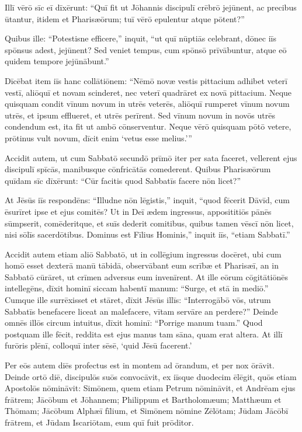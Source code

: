\Versus Illī vērō sīc eī dīxērunt: ``Quī fit ut Jōhannis discipulī crēbrō jejūnent, ac precibus ūtantur, itidem et Pharisæōrum; tuī vērō epulentur atque pōtent?''

\Versus Quibus ille: ``Potestisne efficere,'' inquit, ``ut quī nūptiās celebrant, dōnec iīs spōnsus adest, jejūnent?
\Versus Sed veniet tempus, cum spōnsō prīvābuntur, atque eō quidem tempore jejūnābunt.''

\Versus Dīcēbat item iīs hanc collātiōnem: ``Nēmō novæ vestis pittacium adhibet veterī vestī, aliōquī et novam scinderet, nec veterī quadrāret ex novā pittacium.
\Versus Neque quisquam condit vīnum novum in utrēs veterēs, aliōquī rumperet vīnum novum utrēs, et ipsum efflueret, et utrēs perīrent.
\Versus Sed vīnum novum in novōs utrēs condendum est, ita fit ut ambō cōnserventur.
\Versus Neque vērō quisquam pōtō vetere, prōtinus vult novum, dīcit enim `vetus esse melius.'{}''


\Caput
\Versus Accidit autem, ut cum Sabbatō secundō prīmō iter per sata faceret, vellerent ejus discipulī spīcās, manibusque cōnfricātās comederent.
\Versus Quibus Pharisæōrum quīdam sīc dīxērunt: ``Cūr facitis quod Sabbatīs facere nōn licet?''

\Versus At Jēsūs iīs respondēns: ``Illudne nōn lēgistis,'' inquit, ``quod fēcerit Dāvīd, cum ēsurīret ipse et ejus comitēs?
\Versus Ut in Deī ædem ingressus, apposititiōs pānēs sūmpserit, comēderitque, et suīs dederit comitibus, quibus tamen vēscī nōn licet, nisi sōlīs sacerdōtibus.
\Versus Dominus est Fīlius Hominis,'' inquit iīs, ``etiam Sabbatī.''

\Versus Accidit autem etiam aliō Sabbatō, ut in collēgium ingressus docēret, ubi cum homō esset dexterā manū tābidā,
\Versus observābant eum scrībæ et Pharisæī, an in Sabbatō cūrāret, ut crīmen adversus eum invenīrent.
\Versus At ille eōrum cōgitātiōnēs intellegēns, dīxit hominī siccam habentī manum: ``Surge, et stā in mediō.'' Cumque ille surrēxisset et stāret,
\Versus dīxit Jēsūs illīs: ``Interrogābō vōs, utrum Sabbatīs benefacere liceat an malefacere, vītam servāre an perdere?''
\Versus Deinde omnēs illōs circum intuitus, dīxit hominī: ``Porrige manum tuam.'' Quod postquam ille fēcit, reddita est ejus manus tam sāna, quam erat altera.
\Versus At illī furōris plēnī, colloquī inter sēsē, `quid Jēsū facerent.'

\Versus Per eōs autem diēs profectus est in montem ad ōrandum, et per nox ōrāvit.
\Versus Deinde ortō diē, discipulōs suōs convocāvit, ex iīsque duodecim ēlēgit, quōs etiam Apostolōs nōmināvit:
\Versus Simōnem, quem etiam Petrum nōmināvit, et Andrēam ejus frātrem; Jācōbum et Jōhannem; Philippum et Bartholomæum;
\Versus Matthæum et Thōmam; Jācōbum Alphæī fīlium, et Simōnem nōmine Zēlōtam;
\Versus Jūdam Jācōbī frātrem, et Jūdam Iscariōtam, eum quī fuit prōditor.

